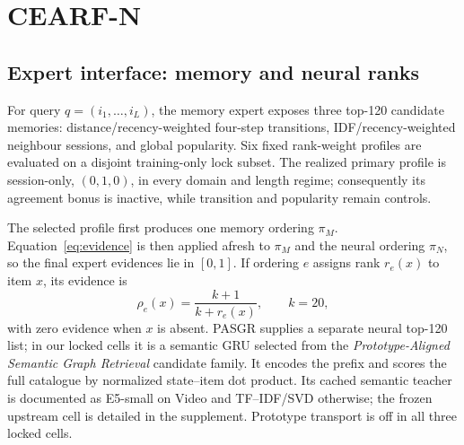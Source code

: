\documentclass[runningheads]{llncs}
\newcommand{\method}{CEARF-N}
\newcommand{\rr}{\rho}
\begin{document}
\section{\method{}}
\subsection{Expert interface: memory and neural ranks}
For query $q=(i_1,\ldots,i_L)$, the memory expert exposes three top-120 candidate
memories: distance/recency-weighted four-step transitions, IDF/recency-weighted
neighbour sessions, and global popularity. Six fixed rank-weight profiles are
evaluated on a disjoint training-only lock subset. The realized primary profile
is session-only, $(0,1,0)$, in every domain and length regime; consequently its
agreement bonus is inactive, while transition and popularity remain controls.

The selected profile first produces one memory ordering $\pi_M$.
Equation~\ref{eq:evidence} is then applied afresh to $\pi_M$ and the neural
ordering $\pi_N$, so the final expert evidences lie in $[0,1]$. If ordering
$e$ assigns rank $r_e(x)$ to item $x$, its evidence is
\begin{equation}
\rr_e(x)=\frac{k+1}{k+r_e(x)},\qquad k=20,
\label{eq:evidence}
\end{equation}
with zero evidence when $x$ is absent. PASGR supplies a separate neural
top-120 list; in our locked cells it is a semantic GRU selected from the
\emph{Prototype-Aligned Semantic Graph Retrieval} candidate family. It encodes
the prefix and scores the full catalogue by normalized state--item dot product.
Its cached semantic teacher is documented as E5-small on Video \cite{wang2022e5}
and TF--IDF/SVD otherwise; the frozen upstream cell is detailed in the
supplement. Prototype transport is off in all three locked cells.
\end{document}
